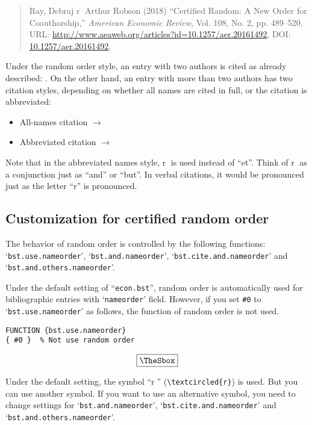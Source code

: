 \documentclass[10pt]{article}
\newenvironment{Frame}%
{\setlength{\fboxsep}{15pt}
\setlength{\mylength}{\linewidth}%
\addtolength{\mylength}{-2\fboxsep}%
\addtolength{\mylength}{-2\fboxrule}%
\Sbox
\minipage{\mylength}%
\setlength{\abovedisplayskip}{0pt}%
\setlength{\belowdisplayskip}{0pt}%
}%
{\endminipage\endSbox
\[\fbox{\TheSbox}\]}
\begin{document}
\begin{quote}
Ray, Debraj \textcircled{r} Arthur Robson (2018) ``Certified Random: A New Order
for Coauthorship,'' \textit{American Economic Review}, Vol. 108, No. 2,
pp. 489--520, URL: \url{http://www.aeaweb.org/articles?id=10.1257/aer.20161492},
DOI: \href{http://dx.doi.org/10.1257/aer.20161492}{10.1257/aer.20161492}.
\end{quote}

Under the random order style, an entry with two authors is cited as already
described: \citet{10.1257/aer.20161492}. On the other hand, an entry with more
than two authors has two citation styles, depending on whether all names are
cited in full, or the citation is abbreviated:
\begin{itemize}
 \item All-names citation $\longrightarrow$ \citet*{NBERw25205}
 \item Abbreviated citation $\longrightarrow$ \citet{NBERw25205}
\end{itemize}

Note that in the abbreviated names style, \textcircled{r} is used instead of
``et''. Think of \textcircled{r} as a conjunction just as ``and'' or ``but''. In
verbal citations, it would be pronounced just as the letter ``r'' is pronounced.

\subsection{Customization for certified random order}

The behavior of random order is controlled by the following functions:
`\texttt{bst.use.nameorder}', `\texttt{bst.and.nameorder}',
`\texttt{bst.cite.and.nameorder}' and `\texttt{bst.and.others.nameorder}'.
\vspace*{1em}

Under the default setting of ``\texttt{econ.bst}'', random order is
automatically used for bibliographic entries with `\texttt{nameorder}' field.
However, if you set \verb|#0| to `\texttt{bst.use.nameorder}' as follows, the
function of random order is not used.
\begin{Frame}
\begin{verbatim}
FUNCTION {bst.use.nameorder}
{ #0 }  % Not use random order
\end{verbatim}
\end{Frame}

Under the default setting, the symbol ``\textcircled{r}''
(\verb|\textcircled{r}|) is used.  But you can use another symbol. If you want
to use an alternative symbol, you need to change settings for
`\texttt{bst.and.nameorder}', `\texttt{bst.cite.and.nameorder}' and
`\texttt{bst.and.others.nameorder}'.
\end{document}
